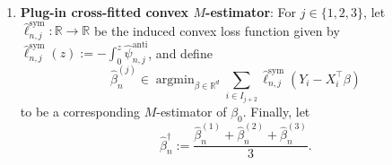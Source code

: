 \documentclass[a4paper]{article}
\newcommand{\R}{\mathbb{R}}
\DeclareMathOperator*{\argmin}{argmin}
\theoremstyle{definition}
\begin{document}
\begin{enumerate}[leftmargin=0.45cm]
\[
\hat{\psi}_{n,j}^{\mathrm{anti}}(z) := \frac{\hat{\psi}_{n,j}(z) - \hat{\psi}_{n,j}(-z)}{2}
\]
for $z \in \R$.
\item \textbf{Plug-in cross-fitted convex $M$-estimator}: For $j \in \{1,2,3\}$, let $\hat{\ell}_{n,j}^{\mathrm{sym}} \colon \R \to \R$ be the induced convex loss function given by $\hat{\ell}_{n,j}^{\mathrm{sym}}(z) := -\int_0^z \hat{\psi}_{n,j}^{\mathrm{anti}}$, and define
\begin{equation}
\label{eq:betahat-sym}
\hat{\beta}_n^{(j)} \in \argmin_{\beta \in \R^d} \sum_{i \in I_{j+2}} \hat{\ell}_{n,j}^{\mathrm{sym}}(Y_i - X_i^\top\beta)
\end{equation}
to be a corresponding $M$-estimator of $\beta_0$. Finally, let
\begin{equation}
\label{eq:DML1}
\hat{\beta}_n^\dagger := \frac{\hat{\beta}_n^{(1)} + \hat{\beta}_n^{(2)} + \hat{\beta}_n^{(3)}}{3}.
\end{equation}
\end{enumerate}
\end{document}
